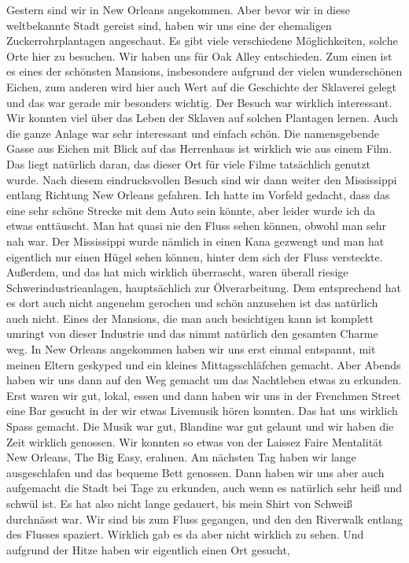 \documentclass[11pt]{book}
\begin{document}
Gestern sind wir in New Orleans angekommen. Aber bevor wir in diese weltbekannte Stadt gereist sind, haben wir uns eine der ehemaligen Zuckerrohrplantagen 
angeschaut. Es gibt viele verschiedene Möglichkeiten, solche Orte hier zu besuchen. Wir haben uns für Oak Alley entschieden. Zum einen ist es eines der schönsten 
Mansions, insbesondere aufgrund der vielen wunderschönen Eichen, zum anderen wird hier auch Wert auf die Geschichte der Sklaverei gelegt und das war gerade 
mir besonders wichtig. Der Besuch war wirklich interessant. Wir konnten viel über das Leben der Sklaven auf solchen Plantagen lernen. Auch die ganze Anlage war 
sehr interessant und einfach schön. Die namensgebende Gasse aus Eichen mit Blick auf das Herrenhaus ist wirklich wie aus einem Film. Das liegt natürlich daran, 
das dieser Ort für viele Filme tatsächlich genutzt wurde. Nach diesem eindrucksvollen Besuch sind wir dann weiter den Mississippi entlang Richtung New Orleans 
gefahren. Ich hatte im Vorfeld gedacht, dass das eine sehr schöne Strecke mit dem Auto sein könnte, aber leider wurde ich da etwas enttäuscht. Man hat quasi nie 
den Fluss sehen können, obwohl man sehr nah war. Der Mississippi wurde nämlich in einen Kana gezwengt und man hat eigentlich nur einen Hügel sehen können, hinter 
dem sich der Fluss versteckte. Außerdem, und das hat mich wirklich überrascht, waren überall riesige Schwerindustrieanlagen, hauptsächlich zur Ölverarbeitung. Dem 
entsprechend hat es dort auch nicht angenehm gerochen und schön anzusehen ist das natürlich auch nicht. Eines der Mansions, die man auch besichtigen kann ist 
komplett umringt von dieser Industrie und das nimmt natürlich den gesamten Charme weg. 
In New Orleans angekommen haben wir uns erst einmal entspannt, mit meinen Eltern geskyped und ein kleines Mittagsschläfchen gemacht. Aber Abends haben wir uns 
dann auf den Weg gemacht um das Nachtleben etwas zu erkunden. Erst waren wir gut, lokal, essen und dann haben wir uns in der Frenchmen Street eine Bar 
gesucht in der wir etwas Livemusik hören konnten. Das hat uns wirklich Spass gemacht. Die Musik war gut, Blandine war gut gelaunt und wir haben die Zeit 
wirklich genossen. Wir konnten so etwas von der Laissez Faire Mentalität New Orleans, The Big Easy, erahnen. 
Am nächsten Tag haben wir lange ausgeschlafen und das bequeme Bett genossen. Dann haben wir uns aber auch aufgemacht die Stadt bei Tage zu erkunden, auch 
wenn es natürlich sehr heiß und schwül ist. Es hat also nicht lange gedauert, bis mein Shirt von Schweiß durchnässt war. Wir sind bis zum Fluss gegangen, und 
den den Riverwalk entlang des Flusses spaziert. Wirklich gab es da aber nicht wirklich zu sehen. Und aufgrund der Hitze haben wir eigentlich einen Ort gesucht, 
\end{document}
